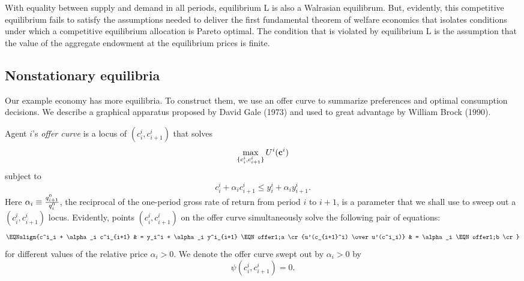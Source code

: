 With equality between supply and demand in all
periods, equilibrium L is also a Walrasian equilibrum.
But, evidently, this competitive equilibrium
fails to satisfy
  the assumptions needed to deliver the
   first fundamental theorem of welfare economics that isolates conditions under which
 a competitive equilibrium allocation is Pareto
optimal.
  The condition that is violated by  equilibrium L
is the assumption that the value of the aggregate endowment
at the equilibrium prices is finite.

\subsection{Nonstationary equilibria}\label{sec:olg_nonstat}%

Our example economy has more  equilibria.
To construct  them, we use an offer curve to summarize preferences and optimal consumption
decisions.   We describe a graphical apparatus proposed
by David Gale (1973) and used  to great advantage by
William Brock (1990).
%
%

\medskip
{}  Agent $i$'s {\it offer curve} is
a locus of $(c_i^i, c^i_{i+1})$ that solves
$$ \max_{\{c_i^i, c^i_{i+1}\}} U^i({\bf c}^i)  $$
subject to
$$ c_i^i + \alpha_i c_{i+1}^i \leq y_i^i + \alpha_i y^i_{i+1} .$$
Here $\alpha_i \equiv {q^0_{i+1}\over q^0_i } $,
 the reciprocal
of the one-period gross rate of return from period $i$ to $i+1$,  is 
a parameter that we shall use to sweep out a $(c_i^i, c_{i+1}^i)$ locus.
\medskip
Evidently, points $(c_i^i, c_{i+1}^i)$ on
 the offer curve simultaneously solve the following pair of equations:
$$\EQNalign{c^i_i + \alpha_i c^i_{i+1} 
        & = y_i^i + \alpha_i y^i_{i+1} \EQN offer1;a  \cr
            {u'(c_{i+1}^i) \over u'(c^i_i)} & = \alpha_i   
                                        \EQN offer1;b  \cr}$$
for  different values of the relative price $\alpha_i > 0$.  
We denote the offer curve  swept out by $\alpha_i > 0 $  by
$$ \psi(c^i_i, c^i_{i+1}) = 0 .$$


